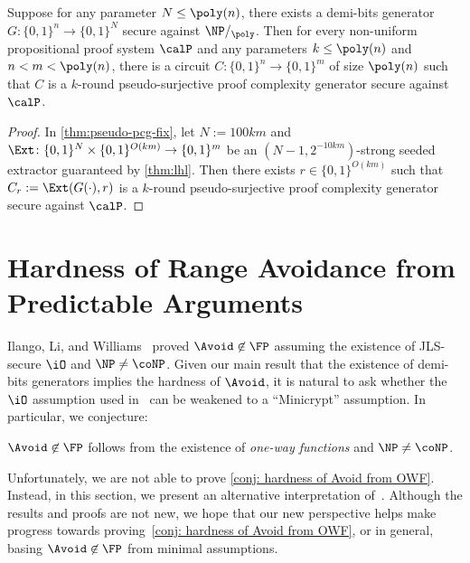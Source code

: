 \begin{corollary}\label{cor: pseudo-surjective}
    Suppose for any parameter $N\leq \poly(n)$, there exists a demi-bits generator $G: \{0,1\}^n \to \{0,1\}^N$ secure against $\NP/_\poly$. Then for every non-uniform propositional proof system $\calP$ and any parameters $k\leq\poly(n)$ and $n<m<\poly(n)$, there is a circuit $C: \{0,1\}^n \to \{0,1\}^m$ of size $\poly(n)$ such that $C$ is a $k$-round pseudo-surjective proof complexity generator secure against $\calP$. %
\end{corollary}
\begin{proof}
    In \autoref{thm:pseudo-pcg-fix}, let $N:=100km$ and $\Ext\colon\{0,1\}^N\times\{0,1\}^{O(km)}\to\{0,1\}^{m}$ be an $(N-1,2^{-10km})$-strong seeded extractor guaranteed by \autoref{thm:lhl}. Then there exists $r\in\{0,1\}^{O(km)}$ such that $C_r:=\Ext(G(\cdot),r)$ is a $k$-round pseudo-surjective proof complexity generator secure against $\calP$. %
\end{proof}

\section{Hardness of Range Avoidance from Predictable Arguments}\label{sec:ILW-interpretation}

Ilango, Li, and Williams~\cite{DBLP:conf/stoc/IlangoLW23} proved $\Avoid\not\in\FP$ assuming the existence of JLS-secure $\iO$ and $\NP\ne\coNP$. Given our main result that the existence of demi-bits generators implies the hardness of $\Avoid$, it is natural to ask whether the $\iO$ assumption used in~\cite{DBLP:conf/stoc/IlangoLW23} can be weakened to a ``Minicrypt'' assumption. In particular, we conjecture:
\begin{conjecture}\label{conj: hardness of Avoid from OWF}
    $\Avoid\not\in\FP$ follows from the existence of \emph{one-way functions} and $\NP\ne\coNP$.
\end{conjecture}

Unfortunately, we are not able to prove \autoref{conj: hardness of Avoid from OWF}. Instead, in this section, we present an alternative interpretation of~\cite{DBLP:conf/stoc/IlangoLW23}. Although the results and proofs are not new, we hope that our new perspective helps make progress towards proving~\autoref{conj: hardness of Avoid from OWF}, or in general, basing $\Avoid\not\in\FP$ from minimal assumptions.

